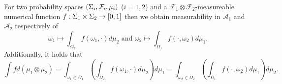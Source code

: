 \begin{theorem}
  \cite[Theorem 23.6]{Bauer}
  For two probability spaces $\left(\Sigma_{i}, \mathcal{F}_{i}, \mu_{i}\right)$ 
  ($i = 1,2$) and a $\mathcal{F}_{1}\otimes\mathcal{F}_{2}$-measureable
  numerical function $f:\Sigma_{1}\times\Sigma_{2}\rightarrow\left[0,1\right]$
  then we obtain measurability in $\mathcal{A}_{1}$ and $\mathcal{A}_{2}$ 
  respectively of
  \begin{equation*}
    \omega_{1}\mapsto\int_{\Omega_{2}} f(\omega_{1},\cdot)d\mu_{2}
    \text{ and }
    \omega_{2}\mapsto\int_{\Omega_{1}} f(\cdot,\omega_{2})d\mu_{1}.
  \end{equation*}
  Additionally, it holds that
  \begin{equation*}
    \int f d(\mu_{1}\otimes\mu_{2}) 
    = \int_{\omega_{1}\in\Omega_{1}}(\int_{\Omega_{2}} f(\omega_{1},\cdot)
      d\mu_{2})d\mu_{1}
    = \int_{\omega_{2}\in\Omega_{2}}(\int_{\Omega_{1}} f(\cdot,\omega_{2})
      d\mu_{1})d\mu_{2}.
  \end{equation*}
  \label{thm:tonelli}
\end{theorem}

